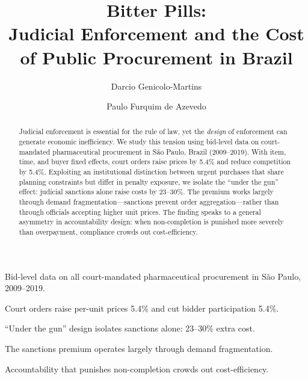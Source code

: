 \documentclass[a4paper,fleqn]{cas-sc}
\begin{document}
\let\WriteBookmarks\relax
\def\floatpagepagefraction{1}
\def\textpagefraction{.001}


\title[mode=title]{Bitter Pills:\\ Judicial Enforcement and the Cost of Public Procurement in Brazil}

\tnotemark[1]

\author[1]{Darcio Genicolo-Martins}
\cormark[1]

\author[1]{Paulo Furquim de Azevedo}


\begin{abstract}
Judicial enforcement is essential for the rule of law, yet the
\emph{design} of enforcement can generate economic inefficiency.
We study this tension using bid-level data on court-mandated
pharmaceutical procurement in S\~ao Paulo, Brazil (2009--2019).
With item, time, and buyer fixed effects, court orders raise
prices by 5.4\% and reduce competition by 5.4\%. Exploiting an
institutional distinction between urgent purchases that share
planning constraints but differ in penalty exposure, we isolate
the ``under the gun'' effect: judicial sanctions alone raise
costs by 23--30\%. The premium works largely through demand
fragmentation---sanctions prevent order aggregation---rather
than through officials accepting higher unit prices. The finding
speaks to a general asymmetry in accountability design: when
non-completion is punished more severely than overpayment,
compliance crowds out cost-efficiency.
\end{abstract}

\begin{highlights}
\item Bid-level data on all court-mandated pharmaceutical procurement in S\~ao Paulo, 2009--2019.
\item Court orders raise per-unit prices 5.4\% and cut bidder participation 5.4\%.
\item ``Under the gun'' design isolates sanctions alone: 23--30\% extra cost.
\item The sanctions premium operates largely through demand fragmentation.
\item Accountability that punishes non-completion crowds out cost-efficiency.
\end{highlights}
\end{document}
